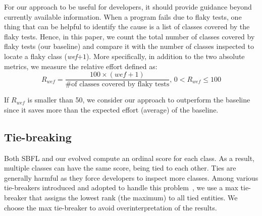 For our approach to be useful for developers, it should provide guidance beyond currently available information. 
When a program fails due to flaky tests, one thing that can be helpful to identify the cause is a list of classes covered by the flaky tests.
Hence, in this paper, we count the total number of classes covered by flaky tests (\ie our baseline) and compare it with the number of classes inspected to locate a flaky class (\ie \textit{wef}$+1$). 
More specifically, in addition to the two absolute metrics, we measure the relative effort defined as:
\[R_{wef} = \frac{100 \times (wef + 1)}{\text{\# of classes covered by flaky tests}}\text{, } 0 < R_{wef} \leq 100\]

If $R_{wef}$ is smaller than 50, we consider our approach to outperform the baseline since it saves more than the expected effort (\ie average) of the baseline.

\subsection{Tie-breaking}
\label{Tie-breaking}
Both SBFL and our evolved \formulas compute an ordinal score for each class. As a result, multiple classes can have the same score, being tied to each other. Ties are generally harmful as they force developers to inspect more classes. Among various tie-breakers introduced and adopted to handle this problem~\cite{xu2011ties}, we use a max tie-breaker that assigns the lowest rank (\ie the maximum) to all tied entities. We choose the max tie-breaker to avoid overinterpretation of the results. 